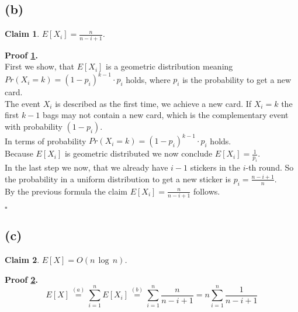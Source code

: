 \documentclass[11pt,a4paper,ngerman]{article}
\newtheorem{lemma}{\bfseries Claim}
\begin{document}
\subsection*{(b)}

\begin{lemma}\label{ex1:t1:rounds}
    $E[X_i] = \frac{n}{n-i+1}$.
\end{lemma}

\textbf{Proof \ref{ex1:t1:rounds}.}\\
First we show, that $E[ X_i ]$ is a geometric distribution meaning\\
$Pr (X_i = k) = (1 - p_i)^{k-1} \cdot p_i$ holds,
where $p_i$ is the probability to get a new card.\\

The event $X_i$ is described as the first time, we achieve a new card. If $X_i = k$ the first $k-1$ bags
may not contain a new card, which is the complementary event with probability $(1- p_i)$.\\

In terms of probability $Pr(X_i = k) = (1 - p_i)^{k-1} \cdot p_i$ holds.\\

Because $E [X_i ]$ is geometric distributed we now conclude
$E[ X_i ] = \frac{1}{p_i}$.\\

In the last step we now, that we already have $i-1$ stickers in the $i$-th round. So the probability
in a uniform distribution to get a new sticker is $p_i = \frac{n - i + 1}{n}$.\\
By the previous formula the claim $E[ X_i ] = \frac{n}{n - i + 1}$ follows.

\mbox{} \hfill $\square$


\subsection*{(c)}

\begin{lemma}\label{ex1:t1:expected}
    $E[X]= O(n\, \log\, n)$.
\end{lemma}


\textbf{Proof \ref{ex1:t1:expected}.}\\
\[
E[X]\stackrel{(a)}{=}\sum_{i=1}^{n}E[X_{i}]\stackrel{(b)}{=}\sum_{i=1}^{n}\frac{n}{n-i+1}=n\sum_{i=1}^{n}\frac{1}{n-i+1}
\]
\end{document}
